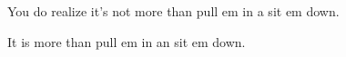 

You do realize it's not more than pull em in a sit em down.

It is more than pull em in an sit em down.

\bye
